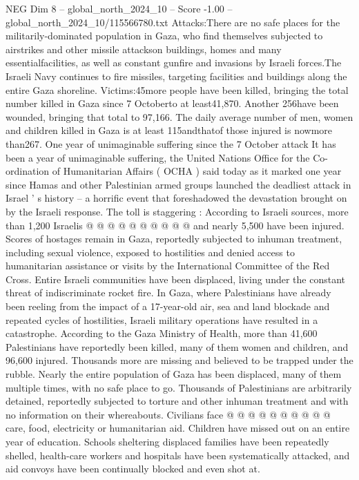 \begin{textsample}{NEG Dim 8 – global\_north\_2024\_10 – Score -1.00 – global\_north\_2024\_10/115566780.txt}  \label{ex:f8_neg_295}
Attacks:There are no safe places for the militarily-dominated population in Gaza, who find themselves subjected to airstrikes and other missile attackson buildings, homes and many essentialfacilities, as well as constant gunfire and invasions by Israeli forces.The Israeli Navy continues to fire missiles, targeting facilities and buildings along the entire Gaza shoreline.
Victims:45more people have been killed, bringing the total number killed in Gaza since 7 Octoberto at least41,870.
Another 256have been wounded, bringing that total to 97,166.
The daily average number of men, women and children killed in Gaza is at least 115andthatof those injured is nowmore than267.
One year of unimaginable suffering since the 7 October attack It has been a year of unimaginable suffering, the United Nations Office for the Co-ordination of Humanitarian Affairs ( OCHA ) said today as it marked one year since Hamas and other Palestinian armed groups launched the deadliest attack in Israel ' s history -- a horrific event that foreshadowed the devastation brought on by the Israeli response.
The toll is staggering : According to Israeli sources, more than 1,200 Israelis @ @ @ @ @ @ @ @ @ @ and nearly 5,500 have been injured.
Scores of hostages remain in Gaza, reportedly subjected to inhuman treatment, including sexual violence, exposed to hostilities and denied access to humanitarian assistance or visits by the International Committee of the Red Cross.
Entire Israeli communities have been displaced, living under the constant threat of indiscriminate rocket fire.
In Gaza, where Palestinians have already been reeling from the impact of a 17-year-old air, sea and land blockade and repeated cycles of hostilities, Israeli military operations have resulted in a catastrophe.
According to the Gaza Ministry of Health, more than 41,600 Palestinians have reportedly been killed, many of them women and children, and 96,600 injured.
Thousands more are missing and believed to be trapped under the rubble.
Nearly the entire population of Gaza has been displaced, many of them multiple times, with no safe place to go.
Thousands of Palestinians are arbitrarily detained, reportedly subjected to torture and other inhuman treatment and with no information on their whereabouts.
Civilians face @ @ @ @ @ @ @ @ @ @ care, food, electricity or humanitarian aid.
Children have missed out on an entire year of education.
Schools sheltering displaced families have been repeatedly shelled, health-care workers and hospitals have been systematically attacked, and aid convoys have been continually blocked and even shot at.

\end{textsample}
